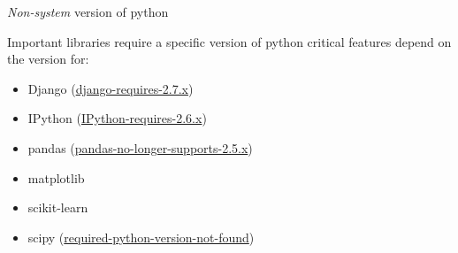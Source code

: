 \documentclass[bigger]{beamer}
\begin{document}
\begin{frame}[label=sec-3-2]{\emph{Non-system} version of python}
\begin{exampleblock}{Important libraries require a specific version of python critical features depend on the version for:}
\begin{itemize}
\item Django (\href{https://docs.djangoproject.com/en/dev/faq/install/}{django-requires-2.7.x})
\item IPython (\href{http://ipython.org/faq.html}{IPython-requires-2.6.x})
\item pandas (\href{http://pandas.pydata.org/pandas-docs/stable/install.html#dependencies}{pandas-no-longer-supports-2.5.x})
\item matplotlib
\item scikit-learn
\item scipy (\href{http://stackoverflow.com/questions/3008509/python-version-2-6-required-which-was-not-found-in-the-registry}{required-python-version-not-found})
\end{itemize}
\end{exampleblock}

\end{frame}
\end{document}
